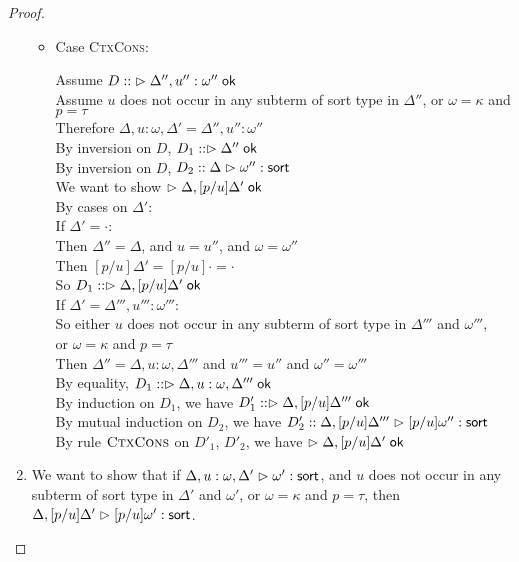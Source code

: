 \begin{proof}
\begin{enumerate}
\begin{itemize}
  \item Case \textsc{CtxCons}: 
    \begin{tabbedproof}
      \oo Assume $D ::\; \judgeACtx{\Delta'', u'':\omega''}$ \\
      \oo Assume $u$ does not occur in any subterm of sort type in $\Delta''$, or $\omega = \kappa$ and $p = \tau$ \\
      \ooo Therefore $\Delta, u:\omega, \Delta' = \Delta'', u'':\omega''$ \\
      \ooo By inversion on $D$, $D_1 :: \judgeACtx{\Delta''}$ \\
      \ooo By inversion on $D$, $D_2 :: \judgeSort{\omega''}$ \\
      \ooo We want to show $\judgeACtx{\Delta, [p/u]\Delta'}$ \\
      \ooo By cases on $\Delta'$: \\
      \oooo If $\Delta' = \cdot$: \\
      \ooooo Then $\Delta'' = \Delta$, and $u = u''$, and $\omega = \omega''$ \\
      \ooooo Then $[p/u]\Delta' = [p/u]\cdot = \cdot$ \\
      \ooooo So $D_1 :: \judgeACtx{\Delta, [p/u]\Delta'}$ \\
      \oooo If $\Delta' = \Delta''', u''':\omega'''$:\\
      \ooooo So either $u$ does not occur in any subterm of sort type in $\Delta'''$ and $\omega'''$, \\
      \ooooox or $\omega = \kappa$ and $p = \tau$ \\ 
      \ooooo Then $\Delta'' = \Delta, u:\omega, \Delta'''$ and $u''' = u''$ and $\omega'' = \omega'''$ \\ 
      \ooooo By equality, $D_1 :: \judgeACtx{\Delta, u:\omega, \Delta'''}$ \\
      \ooooo By induction on $D_1$, we have $D'_1 :: \judgeACtx{\Delta, [p/u]\Delta'''}$ \\ 
      \ooooo By mutual induction on $D_2$, we have 
                 $D'_2 :: \judgeSort[{\Delta, [p/u]\Delta'''}]{[p/u]\omega''}$ \\ 
      \ooooo By rule $\textsc{CtxCons}$ on $D'_1$, $D'_2$, we have 
                 $\judgeACtx{\Delta, [p/u]\Delta'}$ \\
    \end{tabbedproof}
  \end{itemize}

\item We want to show that if 
         $\judgeSort[\Delta, u:\omega, \Delta']{\omega'}$,  
         and $u$ does not occur in any subterm of sort type in $\Delta'$ and $\omega'$, or 
         $\omega = \kappa$ and $p = \tau$, then
         $\judgeSort[{\Delta, [p/u]\Delta'}]{[p/u]\omega'}$. 


\end{enumerate}
\end{proof}
